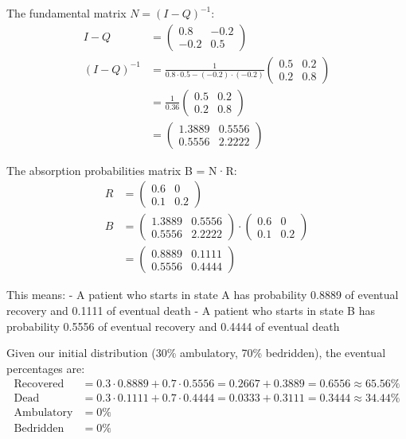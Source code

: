 \documentclass{article}
\begin{document}
The fundamental matrix $N = (I-Q)^{-1}$:
\begin{align*}
I-Q &= \begin{pmatrix}
0.8 & -0.2 \\
-0.2 & 0.5
\end{pmatrix} \\
(I-Q)^{-1} &= \frac{1}{0.8 \cdot 0.5 - (-0.2) \cdot (-0.2)} \begin{pmatrix}
0.5 & 0.2 \\
0.2 & 0.8
\end{pmatrix} \\
&= \frac{1}{0.36} \begin{pmatrix}
0.5 & 0.2 \\
0.2 & 0.8
\end{pmatrix} \\
&= \begin{pmatrix}
1.3889 & 0.5556 \\
0.5556 & 2.2222
\end{pmatrix}
\end{align*}

The absorption probabilities matrix B = N·R:
\begin{align*}
R &= \begin{pmatrix}
0.6 & 0 \\
0.1 & 0.2
\end{pmatrix} \\
B &= \begin{pmatrix}
1.3889 & 0.5556 \\
0.5556 & 2.2222
\end{pmatrix} \cdot \begin{pmatrix}
0.6 & 0 \\
0.1 & 0.2
\end{pmatrix} \\
&= \begin{pmatrix}
0.8889 & 0.1111 \\
0.5556 & 0.4444
\end{pmatrix}
\end{align*}

This means:
- A patient who starts in state A has probability 0.8889 of eventual recovery and 0.1111 of eventual death
- A patient who starts in state B has probability 0.5556 of eventual recovery and 0.4444 of eventual death

Given our initial distribution (30\% ambulatory, 70\% bedridden), the eventual percentages are:
\begin{align*}
\text{Recovered} &= 0.3 \cdot 0.8889 + 0.7 \cdot 0.5556 = 0.2667 + 0.3889 = 0.6556 \approx 65.56\% \\
\text{Dead} &= 0.3 \cdot 0.1111 + 0.7 \cdot 0.4444 = 0.0333 + 0.3111 = 0.3444 \approx 34.44\% \\
\text{Ambulatory} &= 0\% \\
\text{Bedridden} &= 0\%
\end{align*}
\end{document}
